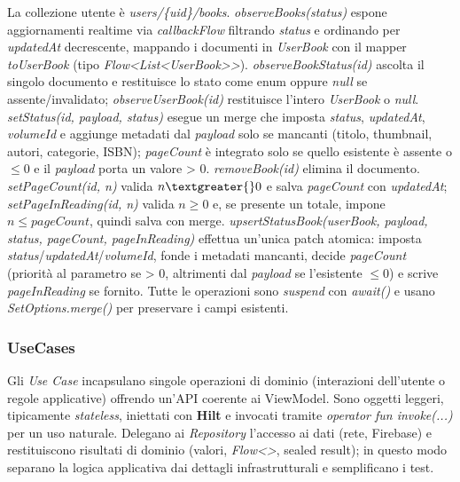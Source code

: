 \documentclass{article}
\begin{document}
\begin{itemize}
\begin{itemize}
    La collezione utente è \textit{users/\{uid\}/books}. \textit{observeBooks(status)} espone aggiornamenti realtime via \textit{callbackFlow} filtrando \textit{status} e ordinando per \textit{updatedAt} decrescente, mappando i documenti in \textit{UserBook} con il mapper \textit{toUserBook} (tipo \textit{Flow\textless{}List\textless{}UserBook\textgreater{}\textgreater{}}).
    \textit{observeBookStatus(id)} ascolta il singolo documento e restituisce lo stato come enum oppure \textit{null} se assente/invalidato; \textit{observeUserBook(id)} restituisce l’intero \textit{UserBook} o \textit{null}. \textit{setStatus(id, payload, status)} esegue un merge che imposta \textit{status}, \textit{updatedAt}, \textit{volumeId} e aggiunge metadati dal \textit{payload} solo se mancanti (titolo, thumbnail, autori, categorie, ISBN);
    \textit{pageCount} è integrato solo se quello esistente è assente o \(\le 0\) e il \textit{payload} porta un valore \textgreater{} 0. \textit{removeBook(id)} elimina il documento. 
    \textit{setPageCount(id, n)} valida \(n \textgreater{} 0\) e salva \textit{pageCount} con \textit{updatedAt}; \textit{setPageInReading(id, n)} valida \(n \ge 0\) e, se presente un totale, impone \(n \le \textit{pageCount}\), 
    quindi salva con merge. \textit{upsertStatusBook(userBook, payload, status, pageCount, pageInReading)} effettua un’unica patch atomica: imposta \textit{status}/\textit{updatedAt}/\textit{volumeId}, fonde i metadati mancanti, decide \textit{pageCount} (priorità al parametro se \textgreater{} 0, altrimenti dal \textit{payload} se l’esistente \(\le 0\)) e scrive \textit{pageInReading} se fornito. Tutte le operazioni sono \textit{suspend} con \textit{await()} e usano \textit{SetOptions.merge()} per preservare i campi esistenti.
  \end{itemize}
\end{itemize}

\subsubsection{UseCases}
Gli \textit{Use Case} incapsulano singole operazioni di dominio (interazioni dell’utente o regole applicative) offrendo un’API coerente ai ViewModel. Sono oggetti leggeri, tipicamente \textit{stateless}, iniettati con \textbf{Hilt} e invocati tramite \textit{operator fun invoke(...)} per un uso naturale. Delegano ai \textit{Repository} l’accesso ai dati (rete, Firebase) e restituiscono risultati di dominio (valori, \textit{Flow\textless{}\textgreater{}}, sealed result); in questo modo separano la logica applicativa dai dettagli infrastrutturali e semplificano i test.
\end{document}
